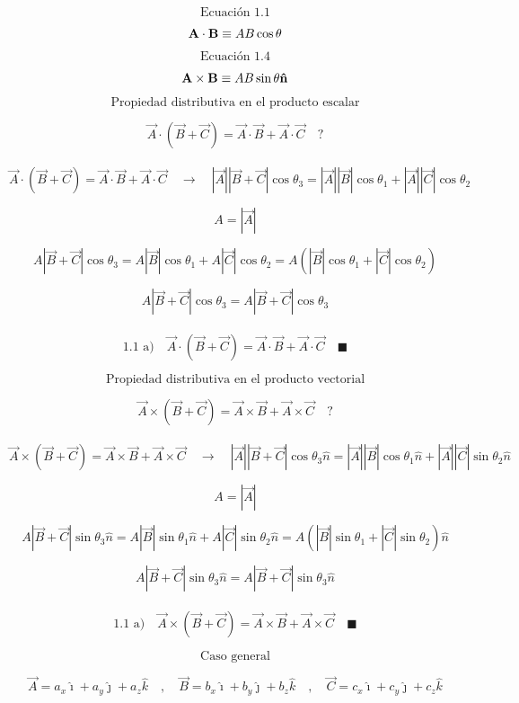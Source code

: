 \documentclass[10pt,a4papper]{article}
\begin{document}
\[\text{Ecuación 1.1}\]

\[\vb{A\cdot B}\equiv AB\cos\theta\]

\[\text{Ecuación 1.4}\]

\[\vb{A\times B}\equiv AB\sin\theta\vb{\hat n}\]

\newpage
\[\text{Propiedad distributiva en el producto escalar}\]

\[\vec A\cdot(\vec B+\vec C)=\vec A\cdot\vec B+\vec A\cdot\vec C\quad?\]\\

\[\vec A\cdot(\vec B+\vec C)=\vec A\cdot\vec B+\vec A\cdot\vec C\quad\to\quad
|\vec A||\vec B+\vec C|\cos\theta_3=|\vec A||\vec B|\cos\theta_1+|\vec A||\vec C|\cos\theta_2\]

\[A=|\vec A|\]

\[A|\vec B+\vec C|\cos\theta_3=A|\vec B|\cos\theta_1+A|\vec C|\cos\theta_2=A\left(|\vec B|\cos\theta_1+|\vec C|\cos\theta_2\right)\]

\[A|\vec B+\vec C|\cos\theta_3=A|\vec B+\vec C|\cos\theta_3\]\\

\[\boxed{\text{1.1 a)}\quad\vec A\cdot(\vec B+\vec C)=\vec A\cdot\vec B+\vec A\cdot\vec C\quad\blacksquare}\]

\newpage
\[\text{Propiedad distributiva en el producto vectorial}\]

\[\vec A\times(\vec B+\vec C)=\vec A\times\vec B+\vec A\times\vec C\quad?\]\\

\[\vec A\times(\vec B+\vec C)=\vec A\times\vec B+\vec A\times\vec C\quad\to\quad
|\vec A||\vec B+\vec C|\cos\theta_3\hat n=|\vec A||\vec B|\cos\theta_1\hat n+|\vec A||\vec C|\sin\theta_2\hat n\]

\[A=|\vec A|\]

\[A|\vec B+\vec C|\sin\theta_3\hat n=A|\vec B|\sin\theta_1\hat n+A|\vec C|\sin\theta_2\hat n=A\left(|\vec B|\sin\theta_1+|\vec C|\sin\theta_2\right)\hat n\]

\[A|\vec B+\vec C|\sin\theta_3\hat n=A|\vec B+\vec C|\sin\theta_3\hat n\]\\

\[\boxed{\text{1.1 a)}\quad\vec A\times(\vec B+\vec C)=\vec A\times\vec B+\vec A\times\vec C\quad\blacksquare}\]

\newpage
\[\text{Caso general}\]

\[\vec A=a_x\hat\imath+a_y\hat\jmath+a_z\hat k\quad,\quad
\vec B=b_x\hat\imath+b_y\hat\jmath+b_z\hat k\quad,\quad
\vec C=c_x\hat\imath+c_y\hat\jmath+c_z\hat k\]
\end{document}

